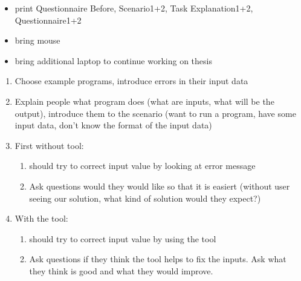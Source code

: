 \documentclass[11pt]{article}
\begin{document}
\begin{itemize}
    \item print Questionnaire Before, Scenario1+2, Task Explanation1+2, Questionnaire1+2
    \item bring mouse
    \item bring additional laptop to continue working on thesis
\end{itemize}


\begin{enumerate}
    \item Choose example programs, introduce errors in their input data
    \item Explain people what program does (what are inputs, what will be the output), introduce them to the scenario (want to run a program, have some input data, don't know the format of the input data)
    \item First without tool:
    \begin{enumerate}
        \item should try to correct input value by looking at error message
        \item Ask questions would they would like so that it is easiert (without user seeing our solution, what kind of solution would they expect?)
    \end{enumerate}
    \item With the tool:
    \begin{enumerate}
        \item should try to correct input value by using the tool
        \item Ask questions if they think the tool helps to fix the inputs. Ask what they think is good and what they would improve.
    \end{enumerate}
\end{enumerate}
\end{document}
